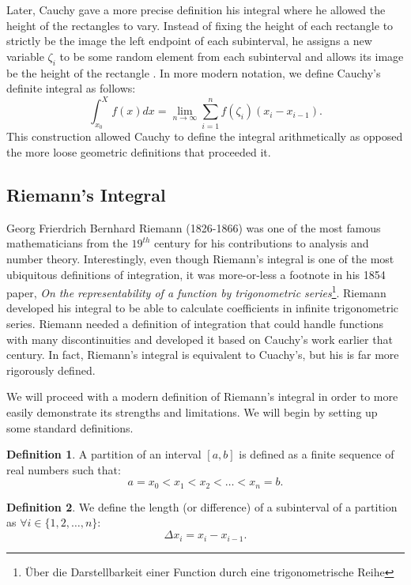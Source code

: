 \documentclass{article}
\theoremstyle{axiom} \newtheorem{axiom}{Axiom}
\theoremstyle{definition} \newtheorem{definition}{Definition}
\theoremstyle{example} \newtheorem{example}{Example}
\theoremstyle{proposition} \newtheorem{prop}{Proposition}
\theoremstyle{lemma} \newtheorem{lemma}{Lemma}
\begin{document}
Later, Cauchy gave a more precise definition his integral where he allowed the
height of the rectangles to vary. Instead of fixing the height of each rectangle to
strictly be the image the left endpoint of each subinterval, he assigns a new 
variable $\zeta_i$ to be some random element from each subinterval and allows 
its image be the height of the rectangle \cite{cauchy:1823}. 
In more modern notation, we define Cauchy's definite integral as follows:
\begin{equation*}
	\int^{X}_{x_0} f(x) dx = \lim_{n\rightarrow \infty} \sum^{n}_{i=1}
	f(\zeta_i)(x_i - x_{i-1}).
\end{equation*}
This construction allowed Cauchy to define the integral arithmetically as
opposed the more loose geometric definitions that proceeded it. 

\subsection{Riemann's Integral}

Georg Frierdrich Bernhard Riemann (1826-1866) was one of the most famous
mathematicians from the $19^{th}$ century for his contributions to analysis and
number theory. Interestingly, even though Riemann's
integral is one of the most ubiquitous definitions of integration, it was 
more-or-less a footnote in his 1854 paper, \textit{On the representability of a function by 
trigonometric series}\footnote{Über die Darstellbarkeit einer Function durch eine 
trigonometrische Reihe}. Riemann developed his integral to be able to calculate
coefficients in infinite trigonometric series. Riemann needed a definition of 
integration that could handle functions with many discontinuities and developed 
it based on Cauchy's work earlier that century. In fact, Riemann's integral is 
equivalent to Cuachy's, but his is far more rigorously defined.

We will proceed with a modern definition of Riemann's integral in order to 
more easily demonstrate its strengths and limitations. We will begin
by setting up some standard definitions.

\begin{definition}
	A partition of an interval $[a,b]$ is defined as a finite sequence of real
	numbers such that:
	\begin{equation}
		a = x_0 < x_1 < x_2 < \ldots < x_n = b.
	\end{equation}
\end{definition}
\begin{definition}
	We define the length (or difference) of a subinterval of a partition as 
	$\forall i \in \{1,2,\ldots, n\}$:
	\begin{equation}
		\Delta x_i = x_i - x_{i-1}.
	\end{equation}
\end{definition}
\end{document}
